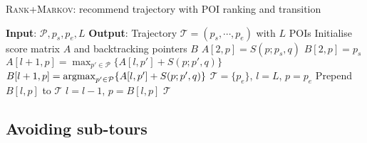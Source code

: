 \setlength{\textfloatsep}{0.5em} %

\begin{algorithm}[t]
\caption{\textsc{Rank+Markov}: recommend trajectory with POI ranking and transition}
\label{alg:rank+markov}
\begin{algorithmic}[1]
\STATE \textbf{Input}: $\mathcal{P}, p_s, p_e, L$
\STATE \textbf{Output}: Trajectory $\mathcal{T} = (p_s, \cdots, p_e)$ with $L$ POIs
\STATE Initialise score matrix $A$ and backtracking pointers $B$
    \STATE $A[2, p] = S(p; p_s, q)$
    \STATE $B[2, p] = p_s$
\ENDFOR
{}
        \STATE $A[l+1, p]   = \max_{p' \in \mathcal{P}} \{ A[l, p'] + S(p; p', q) \}$ \label{eq:max}
        \STATE $B[l+1, p]   = \operatorname*{argmax}_{p' \in \mathcal{P}} \{ A[l, p'] + S(p; p', q) \}$ \label{eq:argmax}
    \ENDFOR
\ENDFOR
\STATE $\mathcal{T}= \{p_e\}$, $l = L$, $p = p_e$
\REPEAT
    \STATE Prepend $B[l, p]$ to $\mathcal{T}$
    \STATE $l = l - 1$, $p = B[l, p]$
\RETURN $\mathcal{T}$
\end{algorithmic}
\end{algorithm}


\subsection{Avoiding sub-tours} 
\label{sec:nosubtour}

